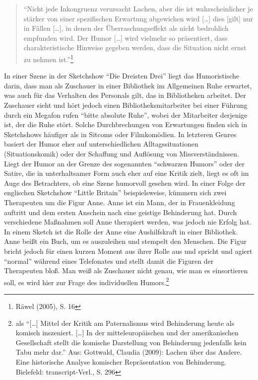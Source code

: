 \begin{quote}
\enquote{Nicht jede Inkongruenz verursacht Lachen, aber die ist
wahrscheinlicher je stärker von einer spezifischen Erwartung abgewichen
wird {[}\ldots{}{]} dies {[}gilt{]} nur in Fällen {[}\ldots{}{]}, in
denen der Überraschungseffekt als nicht bedrohlich empfunden wird. Der
Humor {[}\ldots{}{]} wird vielmehr so präsentiert, dass
charakteristische Hinweise gegeben werden, dass die Situation nicht
ernst zu nehmen ist.}\footnote{Räwel (2005), S. 16}
\end{quote}

In einer Szene in der Sketchshow \enquote{Die Dreisten Drei} liegt das
Humoristische darin, dass man als Zuschauer in einer Bibliothek im
Allgemeinen Ruhe erwartet, was auch für das Verhalten des Personals
gilt, das in Bibliotheken arbeitet. Der Zuschauer sieht und hört jedoch
einen Bibliotheksmitarbeiter bei einer Führung durch ein Megafon rufen
\enquote{bitte absolute Ruhe}, wobei der Mitarbeiter derjenige ist, der
die Ruhe stört. Solche Durchbrechungen von Erwartungen finden sich in
Sketchshows häufiger als in Sitcoms oder Filmkomödien. In letzteren
Genres basiert der Humor eher auf unterschiedlichen Alltagssituationen
(Situationskomik) oder der Schaffung und Auflösung von
Missverständnissen. Liegt der Humor an der Grenze des sogenannten
\enquote{schwarzen Humors} oder der Satire, die in unterhaltsamer Form
auch eher auf eine Kritik zielt, liegt es oft im Auge des Betrachters,
ob eine Szene humorvoll gesehen wird. In einer Folge der englischen
Sketchshow \enquote{Little Britain} beispielsweise, kümmern sich zwei
Therapeuten um die Figur Anne. Anne ist ein Mann, der in Frauenkleidung
auftritt und dem ersten Anschein nach eine geistige Behinderung hat.
Durch verschiedene Maßnahmen soll Anne therapiert werden, was jedoch nie
Erfolg hat. In einem Sketch ist die Rolle der Anne eine Aushilfskraft in
einer Bibliothek. Anne beißt ein Buch, um es auszuleihen und stempelt
den Menschen. Die Figur bricht jedoch für einen kurzen Moment aus ihrer
Rolle aus und spricht und agiert \enquote{normal} während eines
Telefonates und stellt damit die Figuren der Therapeuten bloß. Man weiß
als Zuschauer nicht genau, wie man es einsortieren soll, es wird hier
zur Frage des individuellen Humors.\footnote{als \enquote{{[}\ldots{}{]}
  Mittel der Kritik am Paternalismus wird Behinderung heute als komisch
  inszeniert. {[}\ldots{}{]} In der mitteleuropäischen und der
  amerikanischen Gesellschaft stellt die komische Darstellung von
  Behinderung jedenfalls kein Tabu mehr dar.} Aus: Gottwald, Claudia
  (2009): Lachen über das Andere. Eine historische Analyse komischer
  Repräsentation von Behinderung. Bielefeld: transcript-Verl., S. 296}

